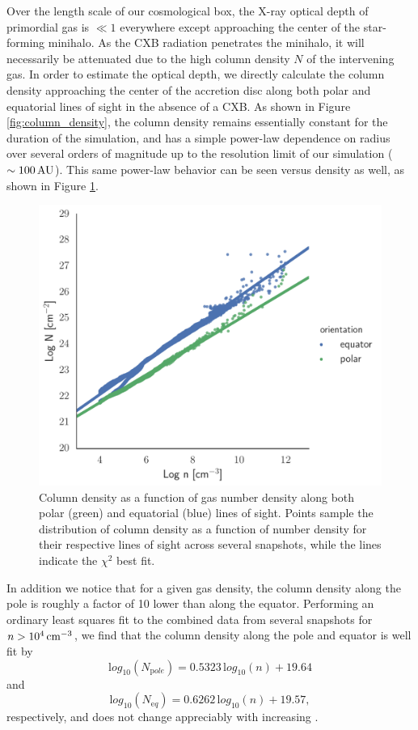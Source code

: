 \documentclass[../thesis.tex]{subfiles}
\begin{document}
Over the length scale of our cosmological box, the X-ray optical depth of primordial gas is $\ll 1$ everywhere except approaching the center of the star-forming minihalo. As the CXB radiation penetrates the minihalo, it will necessarily be attenuated due to the high column density $N$ of the intervening gas.  In order to estimate the optical depth, we directly calculate the column density approaching the center of the accretion disc along both polar and equatorial lines of sight in the absence of a CXB. As shown in Figure \ref{fig:column_density}, the column density remains essentially constant for the duration of the simulation, and has a simple power-law dependence on radius over several orders of magnitude up to the resolution limit of our simulation ($\sim100\,\mathrm{AU}$). This same power-law behavior can be seen versus density as well, as shown in Figure \ref{fig:ncol_fit}. 
\begin{figure}
\begin{center}
\includegraphics[width=\columnwidth]{figures/optical_depth/col_density_fit}
\caption{\label{fig:ncol_fit}
Column density as a function of gas number density along both polar (green) and equatorial (blue) lines of sight.  Points sample the distribution of column density as a function of number density for their respective lines of sight across several snapshots, while the lines indicate the $\chi^2$ best fit.}
\end{center}
\end{figure}
In addition we notice that for a given gas density, the column density along the pole is roughly a factor of 10 lower than along the equator.  Performing an ordinary least squares fit to the combined data from several snapshots for $n > 10^4\,\mathrm{cm}^{-3}$, we find that the column density along the pole and equator is well fit by 
\begin{equation}
{\mathrm log}_{10}(N_{\mathrm pole}) = 0.5323\, {\mathrm log_{10}}(n) + 19.64
\end{equation}
and
\begin{equation}
{\mathrm log}_{10}(N_{\mathrm eq}) = 0.6262\, {\mathrm log_{10}}(n) + 19.57, 
\end{equation}
respectively, and does not change appreciably with increasing \jxr.
\end{document}
